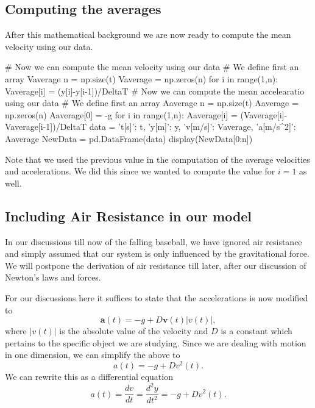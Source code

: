 \documentclass[%
oneside,                 %
final,                   %
10pt]{article}
\begin{document}
\subsection{Computing the averages}
After this mathematical background we are now ready to compute the mean velocity using our data.





















\bpycod
# Now we can compute the mean velocity using our data
# We define first an array Vaverage
n = np.size(t)
Vaverage = np.zeros(n)
for i in range(1,n):
    Vaverage[i] = (y[i]-y[i-1])/DeltaT
# Now we can compute the mean accelearatio using our data
# We define first an array Aaverage
n = np.size(t)
Aaverage = np.zeros(n)
Aaverage[0] = -g
for i in range(1,n):
    Aaverage[i] = (Vaverage[i]-Vaverage[i-1])/DeltaT
data = {'t[s]': t,
        'y[m]': y,
        'v[m/s]': Vaverage,
        'a[m/s^2]': Aaverage
        }
NewData = pd.DataFrame(data)
display(NewData[0:n])

\epycod


Note that we used the previous value in the computation of the average velocities and accelerations. We did this since we wanted to compute the value for $i=1$ as well. 

\subsection{Including Air Resistance in our model}

In our discussions till now of the falling baseball, we have ignored
air resistance and simply assumed that our system is only influenced
by the gravitational force.  We will postpone the derivation of air
resistance till later, after our discussion of Newton's laws and
forces.

For our discussions here it suffices to state that the accelerations is now modified to
\[
\bm{a}(t) = -g +D\bm{v}(t)\vert v(t)\vert,
\]
where $\vert v(t)\vert$ is the absolute value of the velocity and $D$ is a constant which pertains to the specific object we are studying.
Since we are dealing with motion in one dimension, we can simplify the above to
\[
a(t) = -g +Dv^2(t). 
\]
We can rewrite this as a differential equation
\[
a(t) = \frac{dv}{dt}=\frac{d^2y}{dt^2}= -g +Dv^2(t). 
\]
\end{document}
